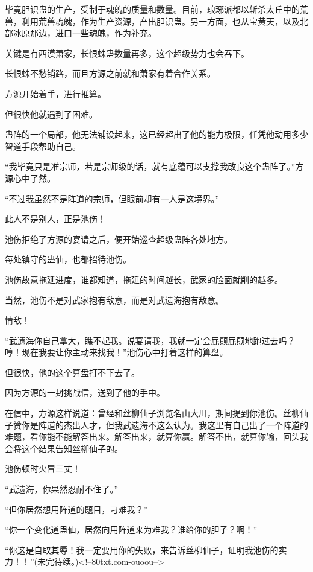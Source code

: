 \begin{this_body}
毕竟胆识蛊的生产，受制于魂魄的质量和数量。目前，琅琊派都以斩杀太丘中的荒兽，利用荒兽魂魄，作为生产资源，产出胆识蛊。另一方面，也从宝黄天，以及北部冰原那边，进口一些魂魄，作为补充。

关键是有西漠萧家，长恨蛛蛊数量再多，这个超级势力也会吞下。

长恨蛛不愁销路，而且方源之前就和萧家有着合作关系。

方源开始着手，进行推算。

但很快他就遇到了困难。

蛊阵的一个局部，他无法铺设起来，这已经超出了他的能力极限，任凭他动用多少智道手段帮助自己。

“我毕竟只是准宗师，若是宗师级的话，就有底蕴可以支撑我改良这个蛊阵了。”方源心中了然。

“不过我虽然不是阵道的宗师，但眼前却有一人是这境界。”

此人不是别人，正是池伤！

池伤拒绝了方源的宴请之后，便开始巡查超级蛊阵各处地方。

每处镇守的蛊仙，也都招待池伤。

池伤故意拖延进度，谁都知道，拖延的时间越长，武家的脸面就削的越多。

当然，池伤不是对武家抱有敌意，而是对武遗海抱有敌意。

情敌！

“武遗海你自己拿大，瞧不起我。说宴请我，我就一定会屁颠屁颠地跑过去吗？哼！现在我要让你主动来找我！”池伤心中打着这样的算盘。

但很快，他的这个算盘打不下去了。

因为方源的一封挑战信，送到了他的手中。

在信中，方源这样说道：曾经和丝柳仙子浏览名山大川，期间提到你池伤。丝柳仙子赞你是阵道的杰出人才，但我武遗海不这么认为。我这里有自己出了一个阵道的难题，看你能不能解答出来。解答出来，就算你赢。解答不出，就算你输，回头我会将这个结果告知丝柳仙子的。

池伤顿时火冒三丈！

“武遗海，你果然忍耐不住了。”

“但你居然想用阵道的题目，刁难我？”

“你一个变化道蛊仙，居然向用阵道来为难我？谁给你的胆子？啊！”

“你这是自取其辱！我一定要用你的失败，来告诉丝柳仙子，证明我池伤的实力！！”(未完待续。)<!--80txt.com-ouoou-->

\end{this_body}

